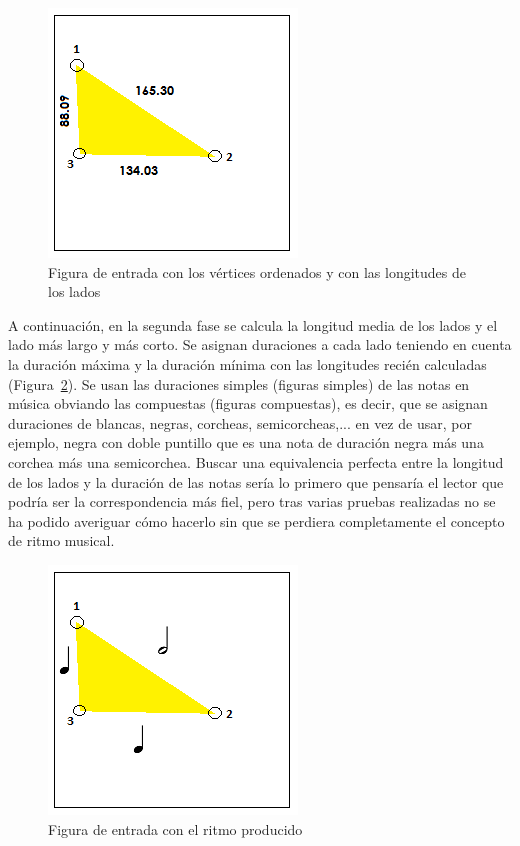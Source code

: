		\begin{figure}[htbp]
		\centering
		\hspace*{0.0in}
		\includegraphics[scale=1.0]{graphics/simpletest1-F1.png}
		\caption{Figura de entrada con los vértices ordenados y con las longitudes de los lados}
		\label{fig:Figura1Voz1}
		\end{figure}

A continuación, en la segunda fase se calcula la longitud media de los lados y el lado más largo y más corto. Se asignan duraciones a cada lado teniendo en cuenta la duración máxima y la duración mínima con las longitudes recién calculadas (Figura~\ref{fig:Figura2Voz1}). Se usan las duraciones simples (figuras simples) de las notas en música obviando las compuestas (figuras compuestas), es decir, que se asignan duraciones de blancas, negras, corcheas, semicorcheas,... en vez de usar, por ejemplo, negra con doble puntillo que es una nota de duración negra más una corchea más una semicorchea. Buscar una equivalencia perfecta entre la longitud de los lados y la duración de las notas sería lo primero que pensaría el lector que podría ser la correspondencia más fiel, pero tras varias pruebas realizadas no se ha podido averiguar cómo hacerlo sin que se perdiera completamente el concepto de ritmo musical.

		\begin{figure}[htbp]
		\centering
		\hspace*{0.0in}
		\includegraphics[scale=1.0]{graphics/simpletest1-F2.png}
		\caption{Figura de entrada con el ritmo producido}
		\label{fig:Figura2Voz1}
		\end{figure}

